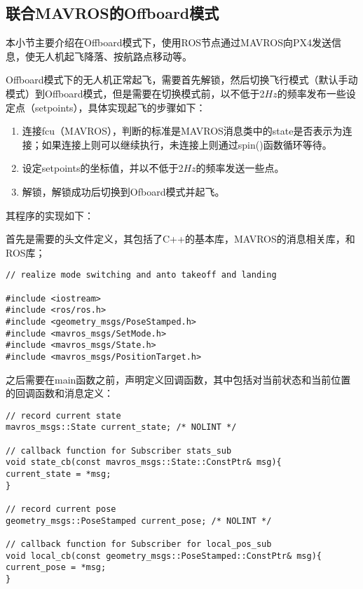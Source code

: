 \subsection{联合MAVROS的Offboard模式} \label{2.2.3}
本小节主要介绍在Offboard模式下，使用ROS节点通过MAVROS向PX4发送信息，使无人机起飞降落、按航路点移动等。

Offboard模式下的无人机正常起飞，需要首先解锁，然后切换飞行模式（默认手动模式）到Offboard模式，但是需要在切换模式前，以不低于2$Hz$的频率发布一些设定点（setpoints），具体实现起飞的步骤如下：

\begin{enumerate}
	\item 
	连接fcu（MAVROS），判断的标准是MAVROS消息类中的state是否表示为连接；如果连接上则可以继续执行，未连接上则通过spin()函数循环等待。
	\item 
	设定setpoints的坐标值，并以不低于2$Hz$的频率发送一些点。
	\item 
	解锁，解锁成功后切换到Ofboard模式并起飞。
\end{enumerate}

其程序的实现如下：

首先是需要的头文件定义，其包括了C++的基本库，MAVROS的消息相关库，和ROS库；

\begin{verbatim}
// realize mode switching and anto takeoff and landing

#include <iostream>
#include <ros/ros.h>
#include <geometry_msgs/PoseStamped.h>
#include <mavros_msgs/SetMode.h>
#include <mavros_msgs/State.h>
#include <mavros_msgs/PositionTarget.h>
\end{verbatim}

之后需要在main函数之前，声明定义回调函数，其中包括对当前状态和当前位置的回调函数和消息定义：
\begin{verbatim}
// record current state
mavros_msgs::State current_state; /* NOLINT */

// callback function for Subscriber stats_sub
void state_cb(const mavros_msgs::State::ConstPtr& msg){
current_state = *msg;
}

// record current pose
geometry_msgs::PoseStamped current_pose; /* NOLINT */

// callback function for Subscriber for local_pos_sub
void local_cb(const geometry_msgs::PoseStamped::ConstPtr& msg){
current_pose = *msg;
}
\end{verbatim}

